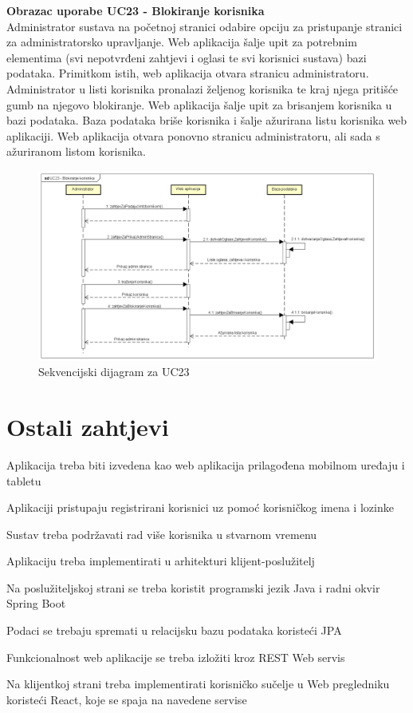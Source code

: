 				\textbf{Obrazac uporabe UC23 - Blokiranje korisnika}\\
				Administrator sustava na početnoj stranici odabire opciju za pristupanje stranici za administratorsko upravljanje. Web aplikacija šalje upit za potrebnim elementima (svi nepotvrđeni zahtjevi i oglasi te svi korisnici sustava) bazi podataka. Primitkom istih, web aplikacija otvara stranicu administratoru. Administrator u listi korisnika pronalazi željenog korisnika te kraj njega pritišće gumb na njegovo blokiranje. Web aplikacija šalje upit za brisanjem korisnika u bazi podataka. Baza podataka briše korisnika i šalje ažurirana listu korisnika web aplikaciji. Web aplikacija otvara ponovno stranicu administratoru, ali sada s ažuriranom listom korisnika.
				
				\begin{figure}[htb]
					\centering
					\includegraphics[width=16cm]{slike/UC23 - Blokiranje korisnika - sekvencijski}
					\caption{Sekvencijski dijagram za UC23}
					\label{fig:Sekvencijski-UC23}
				\end{figure}
				\eject	
	
		\section{Ostali zahtjevi}
		
			\begin{packed_item}
				
				\item Aplikacija treba biti izvedena kao web aplikacija prilagođena mobilnom uređaju i tabletu
				\item Aplikaciji pristupaju registrirani korisnici uz pomoć korisničkog imena i lozinke
				\item Sustav treba podržavati rad više korisnika u stvarnom vremenu
				\item Aplikaciju treba implementirati u arhitekturi klijent-poslužitelj
				\item Na poslužiteljskoj strani se treba koristit programski jezik Java i radni okvir Spring Boot
				\item Podaci se trebaju spremati u relacijsku bazu podataka koristeći JPA
				\item Funkcionalnost web aplikacije se treba izložiti kroz REST Web servis
				\item Na klijentkoj strani treba implementirati korisničko sučelje u Web pregledniku koristeći React, koje se spaja na navedene servise
			\end{packed_item}
			 
			 
			 
	
